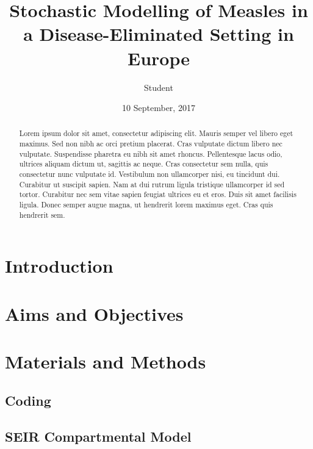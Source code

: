 \documentclass[11pt, a4paper]{article}
\begin{document}
\title{Stochastic Modelling of Measles in a Disease-Eliminated Setting in Europe}
\author{Student}
\date{10 September, 2017}
\maketitle
\onehalfspace
\begin{abstract}
Lorem ipsum dolor sit amet, consectetur adipiscing elit. Mauris semper vel libero
eget maximus. Sed non nibh ac orci pretium placerat. Cras vulputate dictum libero
nec vulputate. Suspendisse pharetra eu nibh sit amet rhoncus. Pellentesque lacus
odio, ultrices aliquam dictum ut, sagittis ac neque. Cras consectetur sem nulla,
quis consectetur nunc vulputate id. Vestibulum non ullamcorper nisi, eu tincidunt
dui. Curabitur ut suscipit sapien. Nam at dui rutrum ligula tristique ullamcorper
id sed tortor. Curabitur nec sem vitae sapien feugiat ultrices eu et eros.
Duis sit amet facilisis ligula. Donec semper augue magna, ut hendrerit lorem
maximus eget. Cras quis hendrerit sem.
\end{abstract}
\clearpage
\tableofcontents
\clearpage
\section{Introduction}

\section{Aims and Objectives}

\section{Materials and Methods}
  \subsection{Coding}
  
  \subsection{SEIR Compartmental Model}
  
\end{document}
